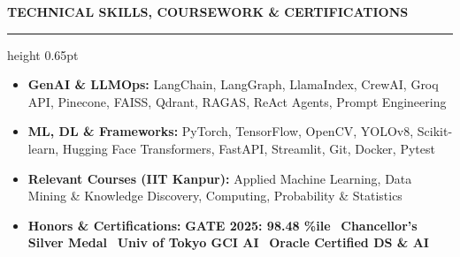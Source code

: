 \documentclass[10pt]{article}
\newcommand{\resumesection}[1]{%
  \vspace{4.5pt}%
  {\large \textbf{\uppercase{#1}}}%
  \vspace{1.5pt}%
  \hrule height 0.65pt%
  \vspace{3pt}%
}
\begin{document}
\resumesection{Technical Skills, Coursework \& Certifications}

\begin{itemize}[noitemsep, topsep=1pt, partopsep=0pt, parsep=0.5pt]
    \item \textbf{GenAI \& LLMOps:} LangChain, LangGraph, LlamaIndex, CrewAI, Groq API, Pinecone, FAISS, Qdrant, RAGAS, ReAct Agents, Prompt Engineering
    \item \textbf{ML, DL \& Frameworks:} PyTorch, TensorFlow, OpenCV, YOLOv8, Scikit-learn, Hugging Face Transformers, FastAPI, Streamlit, Git, Docker, Pytest
    \item \textbf{Relevant Courses (IIT Kanpur):} Applied Machine Learning, Data Mining \& Knowledge Discovery, Computing, Probability \& Statistics
    \item \textbf{Honors \& Certifications:} \textbf{GATE 2025: 98.48 \%ile} \textbullet \ \textbf{Chancellor's Silver Medal} \textbullet \ \textbf{Univ of Tokyo GCI AI} \textbullet \ \textbf{Oracle Certified DS \& AI}
\end{itemize}
\end{document}
